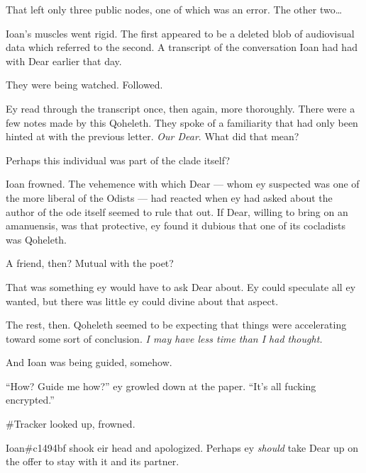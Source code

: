 That left only three public nodes, one of which was an error. The other two\ldots{}

Ioan's muscles went rigid. The first appeared to be a deleted blob of audiovisual data which referred to the second. A transcript of the conversation Ioan had had with Dear earlier that day.

They were being watched. Followed.

Ey read through the transcript once, then again, more thoroughly. There were a few notes made by this Qoheleth. They spoke of a familiarity that had only been hinted at with the previous letter. \emph{Our Dear}. What did that mean?

Perhaps this individual was part of the clade itself?

Ioan frowned. The vehemence with which Dear — whom ey suspected was one of the more liberal of the Odists — had reacted when ey had asked about the author of the ode itself seemed to rule that out. If Dear, willing to bring on an amanuensis, was that protective, ey found it dubious that one of its cocladists was Qoheleth.

A friend, then? Mutual with the poet?

That was something ey would have to ask Dear about. Ey could speculate all ey wanted, but there was little ey could divine about that aspect.

The rest, then. Qoheleth seemed to be expecting that things were accelerating toward some sort of conclusion. \emph{I may have less time than I had thought.}

And Ioan was being guided, somehow.

``How? Guide me how?'' ey growled down at the paper. ``It's all fucking encrypted.''

\#Tracker looked up, frowned.

Ioan\#c1494bf shook eir head and apologized. Perhaps ey \emph{should} take Dear up on the offer to stay with it and its partner.

